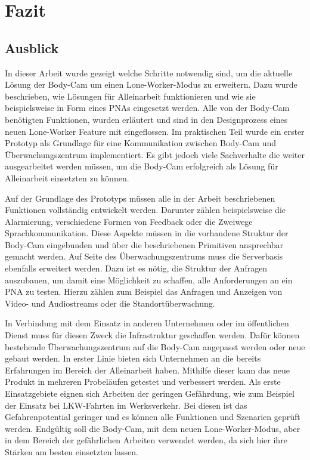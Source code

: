 \documentclass[thesis.tex]{subfiles}
\begin{document}
\chapter{Fazit}\label{chap:fazit}

\section{Ausblick}

In dieser Arbeit wurde gezeigt welche Schritte notwendig sind, um die aktuelle Lösung der Body-Cam um einen Lone-Worker-Modus zu erweitern.
Dazu wurde beschrieben, wie Lösungen für Alleinarbeit funktionieren und wie sie beispielsweise in Form eines PNAs eingesetzt werden.
Alle von der Body-Cam benötigten Funktionen, wurden erläutert und sind in den Designprozess eines neuen Lone-Worker Feature mit eingeflossen.
Im praktischen Teil wurde ein erster Prototyp als Grundlage für eine Kommunikation zwischen Body-Cam und Überwachungszentrum implementiert.
Es gibt jedoch viele Sachverhalte die weiter ausgearbeitet werden müssen, um die Body-Cam erfolgreich als Lösung für Alleinarbeit einsetzten zu können.

Auf der Grundlage des Prototyps müssen alle in der Arbeit beschriebenen Funktionen vollständig entwickelt werden.
Darunter zählen beispielsweise die Alarmierung, verschiedene Formen von Feedback oder die Zweiwege Sprachkommunikation.
Diese Aspekte müssen in die vorhandene Struktur der Body-Cam eingebunden und über die beschriebenen Primitiven ansprechbar gemacht werden.
Auf Seite des Überwachungszentrums muss die Serverbasis ebenfalls erweitert werden.
Dazu ist es nötig, die Struktur der Anfragen auszubauen, um damit eine Möglichkeit zu schaffen, alle Anforderungen an ein PNA zu testen.
Hierzu zählen zum Beispiel das Anfragen und Anzeigen von Video- und Audiostreams oder die Standortüberwachung.

In Verbindung mit dem Einsatz in anderen Unternehmen oder im öffentlichen Dienst muss für diesen Zweck die Infrastruktur geschaffen werden.
Dafür können bestehende Überwachungszentrum auf die Body-Cam angepasst werden oder neue gebaut werden.
In erster Linie bieten sich Unternehmen an die bereits Erfahrungen im Bereich der Alleinarbeit haben.
Mithilfe dieser kann das neue Produkt in mehreren Probeläufen getestet und verbessert werden.
Als erste Einsatzgebiete eignen sich Arbeiten der geringen Gefährdung, wie zum Beispiel der Einsatz bei LKW-Fahrten im Werksverkehr.
Bei diesen ist das Gefahrenpotential geringer und es können alle Funktionen und Szenarien geprüft werden.
Endgültig soll die Body-Cam, mit dem neuen Lone-Worker-Modus, aber in dem Bereich der \glqq gefährlichen Arbeiten\grqq{} verwendet werden, da sich hier ihre Stärken am besten einsetzten lassen.
\end{document}
